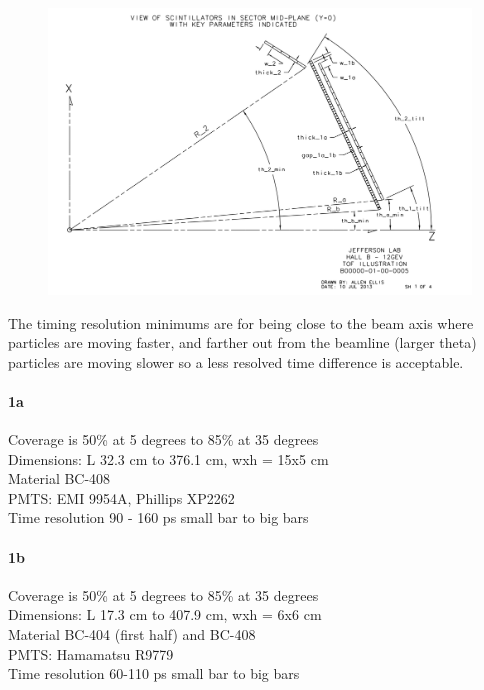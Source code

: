             									

		
			 \begin{figure}[H]
    			\centering
    			\includegraphics[width=12cm]{Chapters/Ch2-Experiment/clas-12-exp/clas-detectors/fd/pics/clas12-ftof-geom.png}
			\end{figure}
			
			
            
            The timing resolution minimums are for being close to the beam axis where particles are moving faster, and farther out from the beamline (larger theta) particles are moving slower so a less resolved time difference is acceptable. 
            
            \paragraph{1a}
                Coverage is 50\% at 5 degrees to 85\% at 35 degrees\\
                Dimensions: L 32.3 cm to 376.1 cm, wxh = 15x5 cm\\
                Material BC-408\\
                PMTS: EMI 9954A, Phillips XP2262\\
                Time resolution 90 - 160 ps small bar to big bars\\
            \paragraph{1b}
                Coverage is 50\% at 5 degrees to 85\% at 35 degrees\\
                Dimensions: L 17.3 cm to 407.9 cm, wxh = 6x6 cm\\
                Material BC-404 (first half) and BC-408\\
                PMTS: Hamamatsu R9779\\
                Time resolution 60-110 ps small bar to big bars\\

